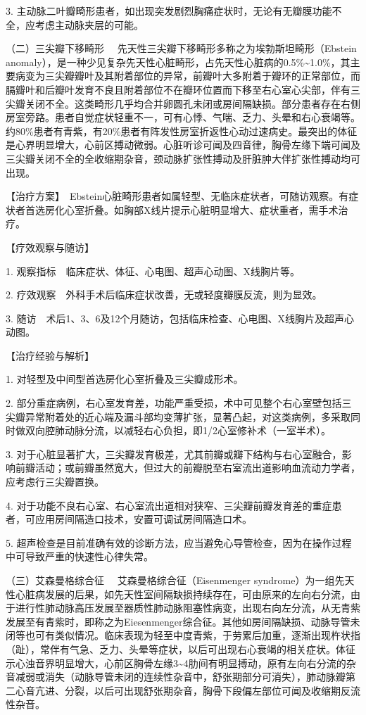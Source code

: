 3.
主动脉二叶瓣畸形患者，如出现突发剧烈胸痛症状时，无论有无瓣膜功能不全，应考虑主动脉夹层的可能。

{（二）三尖瓣下移畸形}
　先天性三尖瓣下移畸形多称之为埃勃斯坦畸形（Ebstein
anomaly），是一种少见复杂先天性心脏畸形，占先天性心脏病的0.5\%\textasciitilde{}1.0\%，其主要病变为三尖瓣瓣叶及其附着部位的异常，前瓣叶大多附着于瓣环的正常部位，而膈瓣叶和后瓣叶发育不良且附着部位不在瓣环位置而下移至右心室心尖部，伴有三尖瓣关闭不全。这类畸形几乎均合并卵圆孔未闭或房间隔缺损。部分患者存在右侧房室旁路。患者自觉症状轻重不一，可有心悸、气喘、乏力、头晕和右心衰竭等。约80\%患者有青紫，有20\%患者有阵发性房室折返性心动过速病史。最突出的体征是心界明显增大，心前区搏动微弱。心脏听诊可闻及四音律，胸骨左缘下端可闻及三尖瓣关闭不全的全收缩期杂音，颈动脉扩张性搏动及肝脏肿大伴扩张性搏动均可出现。

【治疗方案】　Ebstein心脏畸形患者如属轻型、无临床症状者，可随访观察。有症状者首选房化心室折叠。如胸部X线片提示心脏明显增大、症状重者，需手术治疗。

【疗效观察与随访】

1. 观察指标　临床症状、体征、心电图、超声心动图、X线胸片等。

2. 疗效观察　外科手术后临床症状改善，无或轻度瓣膜反流，则为显效。

3.
随访　术后1、3、6及12个月随访，包括临床检查、心电图、X线胸片及超声心动图。

【治疗经验与解析】

1. 对轻型及中间型首选房化心室折叠及三尖瓣成形术。

2.
部分重症病例，右心室发育差，功能严重受损，术中可见整个右心室壁包括三尖瓣异常附着处的近心端及漏斗部均变薄扩张，显著凸起，对这类病例，多采取同时做双向腔肺动脉分流，以减轻右心负担，即1/2心室修补术（一室半术）。

3.
对于心脏显著扩大，三尖瓣发育极差，尤其前瓣或瓣下结构与右心室融合，影响前瓣活动；或前瓣虽然宽大，但过大的前瓣脱至右室流出道影响血流动力学者，应考虑行三尖瓣置换。

4.
对于功能不良右心室、右心室流出道相对狭窄、三尖瓣前瓣发育差的重症患者，可应用房间隔造口技术，安置可调试房间隔造口术。

5.
超声检查是目前准确有效的诊断方法，应当避免心导管检查，因为在操作过程中可导致严重的快速性心律失常。

{（三）艾森曼格综合征} 　艾森曼格综合征（Eisenmenger
syndrome）为一组先天性心脏病发展的后果，如先天性室间隔缺损持续存在，可由原来的左向右分流，由于进行性肺动脉高压发展至器质性肺动脉阻塞性病变，出现右向左分流，从无青紫发展至有青紫时，即称之为Eiesenmenger综合征。其他如房间隔缺损、动脉导管未闭等也可有类似情况。临床表现为轻至中度青紫，于劳累后加重，逐渐出现杵状指（趾），常伴有气急、乏力、头晕等症状，以后可出现右心衰竭的相关症状。体征示心浊音界明显增大，心前区胸骨左缘3\textasciitilde{}4肋间有明显搏动，原有左向右分流的杂音减弱或消失（动脉导管未闭的连续性杂音中，舒张期部分可消失），肺动脉瓣第二心音亢进、分裂，以后可出现舒张期杂音，胸骨下段偏左部位可闻及收缩期反流性杂音。

